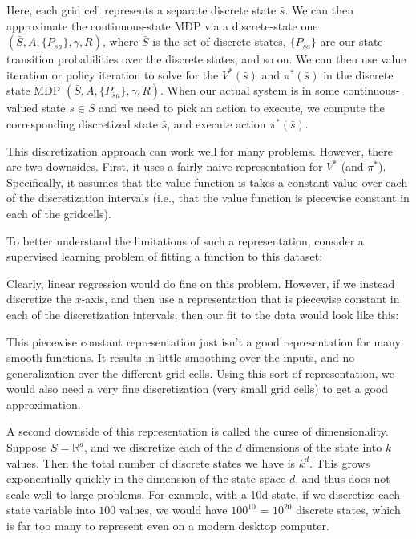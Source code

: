 Here, each grid cell represents a separate discrete state $\bar{s}$. We can then
approximate the continuous-state MDP via a discrete-state one $(\bar{S},A,\{P_{\bar{s}a}\},\gamma,R)$,
where $\bar{S}$ is the set of discrete states, $\{P_{\bar{s}a}\}$ are our state transition
probabilities over the discrete states, and so on. We can then use value iteration or
policy iteration to solve for the $V^*(\bar{s})$ and $\pi^*(\bar{s})$ in the discrete state MDP
$(\bar{S},A,\{P_{\bar{s}a}\},\gamma,R)$. When our actual system is in some continuous-valued
state $s \in S$ and we need to pick an action to execute, we compute the
corresponding discretized state $\bar{s}$, and execute action $\pi^*(\bar{s})$.

This discretization approach can work well for many problems. However,
there are two downsides. First, it uses a fairly naive representation for $V^*$
(and $\pi^*$). Specifically, it assumes that the value function is takes a constant
value over each of the discretization intervals (i.e., that the value function is
piecewise constant in each of the gridcells).

To better understand the limitations of such a representation, consider a
supervised learning problem of fitting a function to this dataset:

Clearly, linear regression would do fine on this problem. However, if we
instead discretize the $x$-axis, and then use a representation that is piecewise
constant in each of the discretization intervals, then our fit to the data would
look like this:

This piecewise constant representation just isn't a good representation for
many smooth functions. It results in little smoothing over the inputs, and no
generalization over the different grid cells. Using this sort of representation,
we would also need a very fine discretization (very small grid cells) to get a
good approximation.

A second downside of this representation is called the curse of dimensionality.
Suppose $S = \mathbb R^d$, and we discretize each of the $d$ dimensions of the
state into $k$ values. Then the total number of discrete states we have is $k^d$.
This grows exponentially quickly in the dimension of the state space $d$, and
thus does not scale well to large problems. For example, with a 10d state, if
we discretize each state variable into $100$ values, we would have $100^10$ = $10^20$
discrete states, which is far too many to represent even on a modern desktop
computer.

